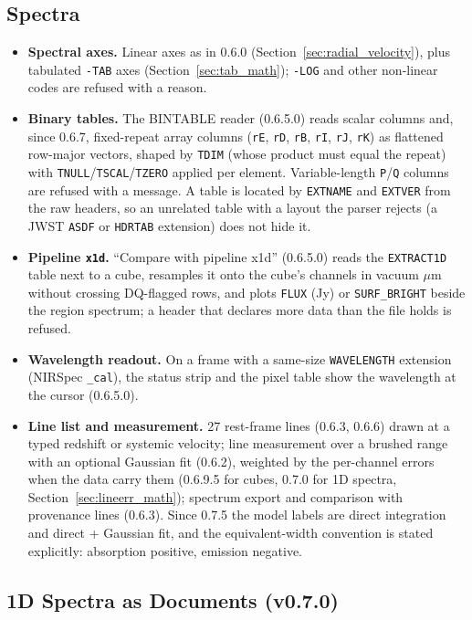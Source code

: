 \documentclass[11pt,a4paper]{article}
\newcommand{\code}[1]{\texttt{\small #1}}
\begin{document}
    \subsection{Spectra}

    \begin{itemize}[nosep]
    \item \textbf{Spectral axes.} Linear axes as in 0.6.0 (Section~\ref{sec:radial_velocity}), plus tabulated \code{-TAB} axes (Section~\ref{sec:tab_math}); \code{-LOG} and other non-linear codes are refused with a reason.
    \item \textbf{Binary tables.} The BINTABLE reader (0.6.5.0) reads scalar columns and, since 0.6.7, fixed-repeat array columns (\code{rE}, \code{rD}, \code{rB}, \code{rI}, \code{rJ}, \code{rK}) as flattened row-major vectors, shaped by \code{TDIM} (whose product must equal the repeat) with \code{TNULL}/\code{TSCAL}/\code{TZERO} applied per element. Variable-length \code{P}/\code{Q} columns are refused with a message. A table is located by \code{EXTNAME} and \code{EXTVER} from the raw headers, so an unrelated table with a layout the parser rejects (a JWST \code{ASDF} or \code{HDRTAB} extension) does not hide it.
    \item \textbf{Pipeline \code{x1d}.} ``Compare with pipeline x1d'' (0.6.5.0) reads the \code{EXTRACT1D} table next to a cube, resamples it onto the cube's channels in vacuum $\mu$m without crossing DQ-flagged rows, and plots \code{FLUX} (Jy) or \code{SURF\_BRIGHT} beside the region spectrum; a header that declares more data than the file holds is refused.
    \item \textbf{Wavelength readout.} On a frame with a same-size \code{WAVELENGTH} extension (NIRSpec \code{\_cal}), the status strip and the pixel table show the wavelength at the cursor (0.6.5.0).
    \item \textbf{Line list and measurement.} 27 rest-frame lines (0.6.3, 0.6.6) drawn at a typed redshift or systemic velocity; line measurement over a brushed range with an optional Gaussian fit (0.6.2), weighted by the per-channel errors when the data carry them (0.6.9.5 for cubes, 0.7.0 for 1D spectra, Section~\ref{sec:lineerr_math}); spectrum export and comparison with provenance lines (0.6.3). Since 0.7.5 the model labels are direct integration and direct + Gaussian fit, and the equivalent-width convention is stated explicitly: absorption positive, emission negative.
    \end{itemize}

    \subsection{1D Spectra as Documents (v0.7.0)}
    \label{sec:spec1d}
\end{document}
